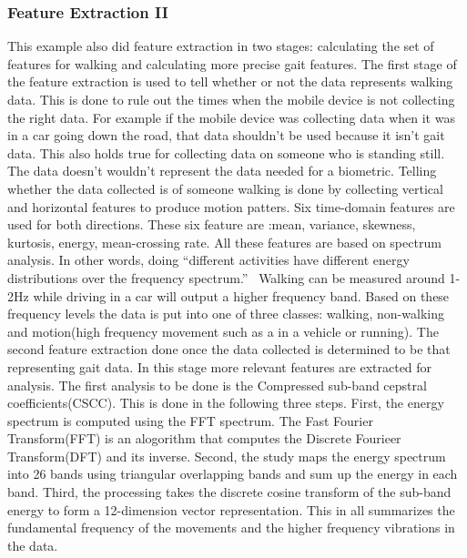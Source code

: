 \documentclass{sig-alternate}
\begin{document}
\subsubsection{Feature Extraction II}
This example also did feature extraction in two stages: calculating the set of features for walking and calculating more precise gait features. 
The first stage of the feature extraction is used to tell whether or not the data represents walking data. This is done to rule out the times when the mobile device is not collecting the right data. For example if the mobile device was collecting data when it was in a car going down the road, that data shouldn't be used because it isn't gait data. This also holds true for collecting data on someone who is standing still. The data doesn't wouldn't represent the data needed for a biometric. Telling whether the data collected is of someone walking is done by collecting vertical and horizontal features to produce motion patters. Six time-domain features are used for both directions. These six feature are :mean, variance, skewness, kurtosis, energy, mean-crossing rate. All these features are based on spectrum analysis. In other words, doing ``different activities have different energy distributions over the frequency spectrum.''~\cite{Lu:2014} Walking can be measured around 1-2Hz while driving in a car will output a higher frequency band. Based on these frequency levels the data is put into one of three classes: walking, non-walking and motion(high frequency movement such as a in a vehicle or running).
The second feature extraction done once the data collected is determined to be that representing gait data. In this stage more relevant features are extracted for analysis. The first analysis to be done is the Compressed sub-band cepstral coefficients(CSCC). This is done in the following three steps. First, the energy spectrum is computed using the FFT spectrum. The Fast Fourier Transform(FFT) is an alogorithm that computes the Discrete Fourieer Transform(DFT) and its inverse. 
Second, the study maps the energy spectrum into 26 bands using triangular overlapping bands and sum up the energy in each band. Third, the processing takes the discrete cosine transform of the sub-band energy to form a 12-dimension vector representation. This in all summarizes the fundamental frequency of the movements and the higher frequency vibrations in the data.
\end{document}
